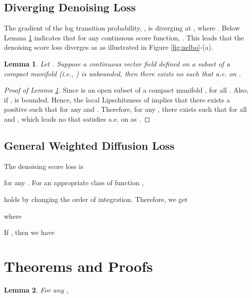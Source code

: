 \documentclass[nohyperref]{article}
\theoremstyle{plain}
\newtheorem{lemma}{Lemma}
\theoremstyle{definition}
\theoremstyle{remark}
\begin{document}
\subsection{Diverging Denoising Loss}\label{sec:score_fail}

The gradient of the log transition probability, , is diverging at , where . Below Lemma \ref{lemma:2} indicates that  for any continuous score function, . This leads that the denoising score loss diverges as  as illustrated in Figure \ref{fig:nelbo}-(a).

\begin{lemma}\label{lemma:2}
		Let . Suppose a continuous vector field  defined on a subset  of a compact manifold  (i.e., ) is unbounded, then there exists no  such that  a.e. on .
	\end{lemma}

\begin{proof}[Proof of Lemma \ref{lemma:2}]
		Since  is an open subset of a compact manifold ,  for all . Also, if ,  is bounded. Hence, the local Lipschitzness of  implies that there exists a positive  such that  for any  and . Therefore, for any , there exists  such that  for all  and , which leads no  that satisfies  a.e. on  as .
	\end{proof}

\subsection{General Weighted Diffusion Loss}\label{sec:general_weight}
The denoising score loss is

for any . For an appropriate class of function ,

holds by changing the order of integration. Therefore, we get

where

If , then we have



\section{Theorems and Proofs}\label{sec:proof}

\begingroup
\renewcommand\thelemma{1}
\begin{lemma}\label{lemma:1}
For any ,

\end{lemma}
\endgroup
\end{document}
